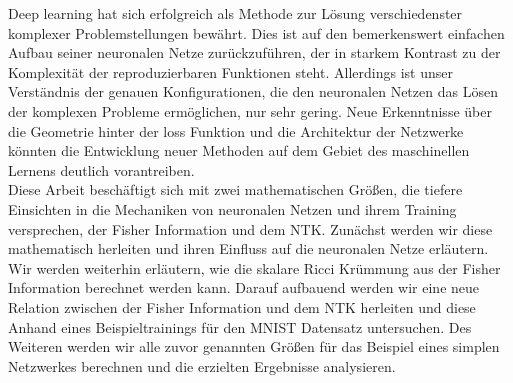 Deep learning hat sich erfolgreich als Methode zur Lösung verschiedenster komplexer Problemstellungen bewährt. Dies ist auf den bemerkenswert einfachen Aufbau seiner neuronalen Netze zurückzuführen, der in starkem Kontrast zu der Komplexität der reproduzierbaren Funktionen steht. Allerdings ist unser Verständnis der genauen Konfigurationen, die den neuronalen Netzen das Lösen der komplexen Probleme ermöglichen, nur sehr gering. Neue Erkenntnisse über die Geometrie hinter der loss Funktion und die Architektur der Netzwerke könnten die Entwicklung neuer Methoden auf dem Gebiet des maschinellen Lernens deutlich vorantreiben.\\
Diese Arbeit beschäftigt sich mit zwei mathematischen Grö\ss en, die tiefere Einsichten in die Mechaniken von neuronalen Netzen und ihrem Training versprechen, der Fisher Information und dem NTK. Zunächst werden wir diese mathematisch herleiten und ihren Einfluss auf die neuronalen Netze erläutern. Wir werden weiterhin erläutern, wie die skalare Ricci Krümmung aus der Fisher Information berechnet werden kann. Darauf aufbauend werden wir eine neue Relation zwischen der Fisher Information und dem NTK herleiten und diese Anhand eines Beispieltrainings für den MNIST Datensatz untersuchen. Des Weiteren werden wir alle zuvor genannten Grö\ss en für das Beispiel eines simplen Netzwerkes berechnen und die erzielten Ergebnisse analysieren.